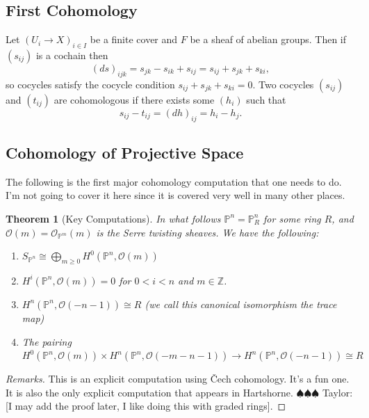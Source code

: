 \documentclass[12pt]{article}
\numberwithin{equation}{section}
\newtheorem{theorem}{Theorem}[subsection]
\theoremstyle{definition}
\newtheorem{exercise}[theorem]{Exercise}
\theoremstyle{remark}
\newcommand{\ZZ}{\mathbb{Z}}
\newcommand{\Ocal}{\mathcal{O}}
\newcommand{\PP}{\mathbb{P}}
\newcommand{\Ucal}{\mathcal{U}}
\newcommand{\Wcal}{\mathcal{W}}
\newcommand{\Vcal}{\mathcal{V}}
\newcommand{\taylor}[1]{{\color{blue} \sf $\spadesuit\spadesuit\spadesuit$ Taylor: [#1]}}
\begin{document}

\subsection{First Cohomology}
Let $(U_i\to X)_{i\in I}$ be a finite cover and $F$ be a sheaf of abelian groups. 
Then if $(s_{ij})$ is a cochain then 
 $$ (ds)_{ijk} = s_{jk}-s_{ik}+s_{ij} = s_{ij} + s_{jk} + s_{ki}, $$
so cocycles satisfy the cocycle condition $s_{ij}+s_{jk}+s_{ki}=0$. 
Two cocycles $(s_{ij})$ and $(t_{ij})$ are cohomologous if there exists some $(h_i)$ such that 
 $$ s_{ij}  - t_{ij} = (dh)_{ij} = h_i-h_j.$$

\subsection{Cohomology of Projective Space}
The following is the first major cohomology computation that one needs to do. 
I'm not going to cover it here since it is covered very well in many other places. 
\begin{theorem}[Key Computations]\label{thm:cohomology-of-projective-space}
	In what follows $\PP^n=\PP^n_R$ for some ring $R$, and $\Ocal(m) = \Ocal_{\PP^m}(m)$ is the Serre twisting sheaves. 
	We have the following:
	\begin{enumerate}
		\item $S_{\PP^n} \cong \bigoplus_{m\geq 0} H^0(\PP^n, \Ocal(m))$
		\item $H^i(\PP^n,\Ocal(m))=0$ for $0<i<n$ and $m\in \ZZ$.
		\item $H^n(\PP^n,\Ocal(-n-1))\cong R$ (we call this canonical isomorphism the trace map)
		\item The pairing $H^0(\PP^n,\Ocal(m))\times H^n(\PP^n,\Ocal(-m-n-1)) \to H^n(\PP^n,\Ocal(-n-1)) \cong R$
	\end{enumerate}
\end{theorem}
\begin{proof}[Remarks]
	This is an explicit computation using \v{C}ech cohomology. 
	It's a fun one. 
	It is also the only explicit computation that appears in Hartshorne. 
	\taylor{I may add the proof later, I like doing this with graded rings}.
\end{proof}
\end{document}
